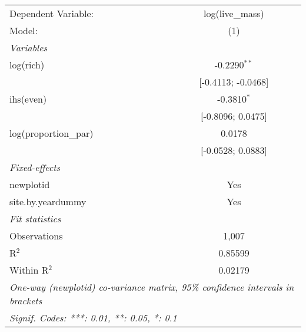 \begin{tabular}{lc}
\tabularnewline\midrule\midrule
Dependent Variable:&log(live\_mass)\\
Model:&(1)\\
\midrule \emph{Variables}&  \\
log(rich)&-0.2290$^{**}$\\
  &[-0.4113; -0.0468]\\
ihs(even)&-0.3810$^{*}$\\
  &[-0.8096; 0.0475]\\
log(proportion\_par)&0.0178\\
  &[-0.0528; 0.0883]\\
\midrule \emph{Fixed-effects}&  \\
newplotid & Yes\\
site.by.yeardummy & Yes\\
\midrule \emph{Fit statistics}&  \\
Observations & 1,007\\
R$^2$ & 0.85599\\
Within R$^2$ & 0.02179\\
\midrule\midrule\multicolumn{2}{l}{\emph{One-way (newplotid) co-variance matrix, 95\% confidence intervals in brackets}}\\
\multicolumn{2}{l}{\emph{Signif. Codes: ***: 0.01, **: 0.05, *: 0.1}}\\
\end{tabular}


